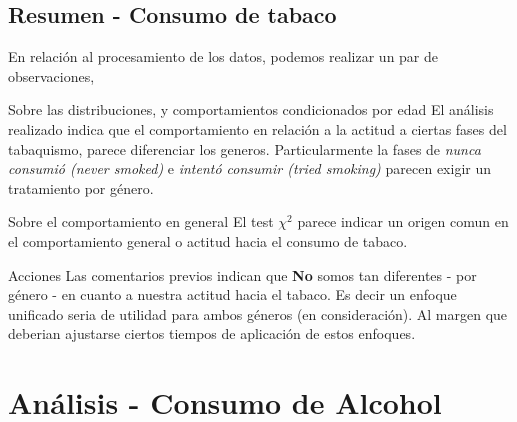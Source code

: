 \documentclass[8pt]{beamer}
\begin{document}
\subsection{Resumen - Consumo de tabaco}
\begin{frame}
En relación al procesamiento de los datos, podemos realizar un par de observaciones,
\pause
\begin{block}{Sobre las distribuciones, y comportamientos condicionados por edad}
El análisis realizado indica que el comportamiento en relación a la actitud a ciertas fases del tabaquismo, parece diferenciar
los generos. Particularmente la fases de \textit{nunca consumió (never smoked)} e \textit{intentó consumir (tried smoking)} parecen
exigir un tratamiento por género.  
\end{block}

\pause
\begin{block}{Sobre el comportamiento en general}
El test $\chi^2$ parece indicar un origen comun en el comportamiento general o actitud hacia el consumo de tabaco. 
\end{block} 

\pause
\begin{alertblock}{Acciones}
Las comentarios previos indican que \textbf{No} somos tan diferentes - por género - en cuanto a nuestra actitud hacia el tabaco. Es decir
un enfoque unificado seria de utilidad para ambos géneros (en consideración).  Al margen que deberian ajustarse ciertos tiempos de aplicación de estos enfoques.
\end{alertblock} 

\end{frame}



\section{Análisis - Consumo de Alcohol}
\end{document}
